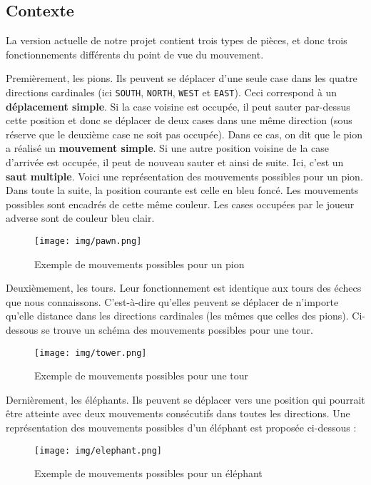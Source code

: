 \documentclass[a4paper]{article}
\begin{document}
\subsection{Contexte}
\label{contxt}
La version actuelle de notre projet contient trois types de pièces, et donc trois fonctionnements différents du point de vue du mouvement.

Premièrement, les pions. Ils peuvent se déplacer d'une seule case dans les quatre directions cardinales (ici \verb|SOUTH|, \verb|NORTH|, \verb|WEST| et \verb|EAST|). Ceci correspond à un \textbf{déplacement simple}. Si la case voisine est occupée, il peut sauter par-dessus cette position et donc se déplacer de deux cases dans une même direction (sous réserve que le deuxième case ne soit pas occupée). Dans ce cas, on dit que le pion a réalisé un \textbf{mouvement simple}. Si une autre position voisine de la case d'arrivée est occupée, il peut de nouveau sauter et ainsi de suite. Ici, c'est un \textbf{saut multiple}. Voici une représentation des mouvements possibles pour un pion. Dans toute la suite, la position courante est celle en bleu foncé. Les mouvements possibles sont encadrés de cette même couleur. Les cases occupées par le joueur adverse sont de couleur bleu clair.

\begin{figure}[H]
  \centering
  \texttt{[image: img/pawn.png]}
  \caption{Exemple de mouvements possibles pour un pion}
  \label{fig:pawn}
\end{figure}

Deuxièmement, les tours. Leur fonctionnement est identique aux tours des échecs que nous connaissons. C'est-à-dire qu'elles peuvent se déplacer de n'importe qu'elle distance dans les directions cardinales (les mêmes que celles des pions). Ci-dessous se trouve un schéma des mouvements possibles pour une tour.

\begin{figure}[H]
  \centering
  \texttt{[image: img/tower.png]}
  \caption{Exemple de mouvements possibles pour une tour}
  \label{fig:tower}
\end{figure}

Dernièrement, les éléphants. Ils peuvent se déplacer vers une position qui pourrait être atteinte avec deux mouvements consécutifs dans toutes les directions. Une représentation des mouvements possibles d'un éléphant est proposée ci-dessous :

\begin{figure}[H]
  \centering
  \texttt{[image: img/elephant.png]}
  \caption{Exemple de mouvements possibles pour un éléphant}
  \label{fig:elephant}
\end{figure}
\end{document}
